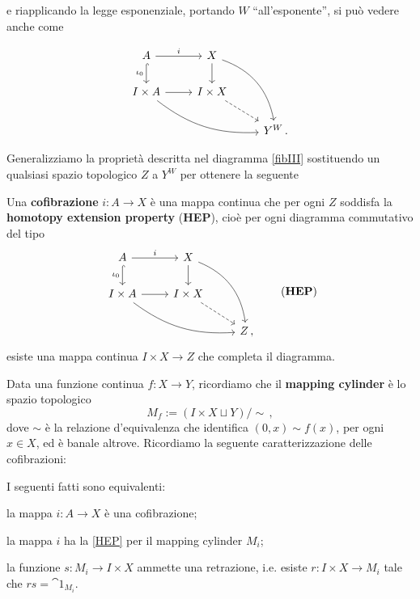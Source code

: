 e riapplicando la legge esponenziale,
portando $W$ ``all'esponente'',
si può vedere anche come
	
	\begin{equation}\label{fibIII}
		\begin{tikzcd}
			A  \ar[r, "i"]
			 \ar[d, hook, "\iota_{0}"'] 
			 & X \ar[d]  \ar[ddr, bend left] & \\
			I \times A \ar[r]  \ar[drr, bend right=20pt]
			& I \times X \ar[dr, dashed] & \\
			& & Y^{W} \,.
		\end{tikzcd}
	\end{equation}
	
Generalizziamo la proprietà descritta nel diagramma \eqref{fibIII}
sostituendo un qualsiasi spazio topologico $Z$ a $Y^{W}$ per
ottenere la seguente

\begin{df}
	Una \textbf{cofibrazione} $i:A \to X$ è una mappa continua che
	per ogni $Z$ soddisfa la \textbf{homotopy extension property} 
	(\textbf{HEP}), cioè per ogni diagramma commutativo del tipo
	\begin{equation}\label{HEP}
		\begin{tikzcd}
			A  \ar[r, "i"]
			 \ar[d, hook, "\iota_{0}"'] 
			 & X \ar[d]  \ar[ddr, bend left] & \\
			I \times A \ar[r]  \ar[drr, bend right=20pt]
			& I \times X \ar[dr, dashed] & \\
			& & Z \,,
		\end{tikzcd}
		\tag{\textbf{HEP}}
	\end{equation}
	esiste una mappa continua $I \times X \to Z$ che completa il diagramma.
\end{df}

Data una funzione continua $f:X \to Y$, 
ricordiamo che il \textbf{mapping cylinder} è lo spazio topologico
\begin{equation*}
	M_{f} := \left( I \times X \sqcup Y \right) / \sim \,,
\end{equation*}
dove $\sim$ è la relazione d'equivalenza che identifica $(0,x) \sim f(x)$,
per ogni $x \in X$, ed è banale altrove. Ricordiamo la seguente
caratterizzazione delle cofibrazioni:

\begin{thm}
	I seguenti fatti sono equivalenti:
	\begin{rmnumerate}
		\item la mappa $i:A \to X$ è una cofibrazione;
		\item la mappa $i$ ha la \eqref{HEP} per il mapping cylinder $M_{i}$;
		\item la funzione $s:M_{i} \to I \times X$ ammette una retrazione,
		i.e. esiste $r:I \times X \to M_{i}$ 
		tale che $rs=\cat{1}_{M_{i}}$.
	\end{rmnumerate}
\end{thm}

